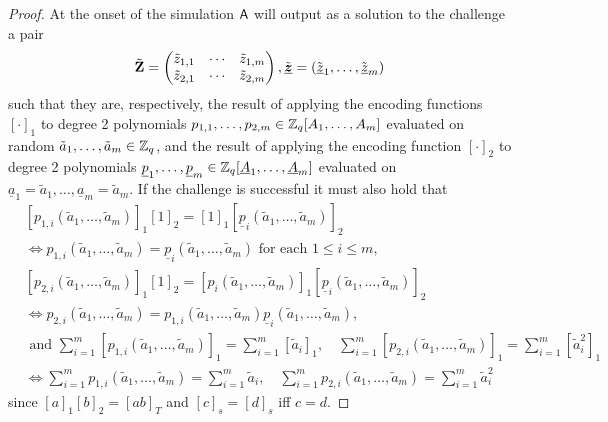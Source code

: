 \begin{proof}
At the onset of the simulation $\mathsf{A}$ will output as a solution to the challenge a pair
$$
\tilde{\mathbf{{Z}}}=\left(\begin{matrix}\tilde{z}_{1,1}&\cdots&\tilde{z}_{1,m}\\\tilde{z}_{2,1}&\cdots&\tilde{z}_{2,m}\end{matrix}\right),\tilde{\underline{{\boldsymbol{z}}}} = (\tilde{\underline{z}}_1,\ldots,\tilde{\underline{z}}_m)
$$
such that they are, respectively, the result of applying the encoding functions $[\cdot]_1$ to degree 2 polynomials $p_{1,1},\ldots,p_{2,m}\in\mathbb{Z}_q[A_{1},\ldots,\allowbreak A_{m}]$ evaluated on random $\tilde{a}_{1},\ldots,\tilde{a}_{m}\in\mathbb{Z}_q$, and the result of applying the encoding function $[\cdot]_2$ to  degree 2 polynomials $\underline{p}_{1},\ldots,\underline{p}_m\in\mathbb{Z}_q[\underline{A}_1,\ldots,\underline{A}_{m}]$ evaluated on $\underline{a}_{1} = \tilde{a}_{1},\ldots,\underline{a}_{m} = \tilde{a}_{m}$.
If the challenge is successful it must also hold that
\begin{align}
&[p_{1,i}(\tilde{a}_{1},\ldots,\tilde{a}_{m})]_1[1]_2 = [1]_1[\underline{p}_i(\tilde{a}_{1},\ldots,\tilde{a}_{m})]_2 \nonumber\\
& \Longleftrightarrow 
p_{1,i}(\tilde{a}_{1},\ldots,\tilde{a}_{m}) = \underline{p}_i(\tilde{a}_{1},\ldots,\tilde{a}_{m}) \text{ for each }1\leq i \leq m,
\label{eq:lin}\\
	&[p_{2,i}(\tilde{a}_{1},\ldots,\tilde{a}_{m})]_1[1]_2 = [p_{i}(\tilde{a}_{1},\ldots,\tilde{a}_{m})]_1[\underline{p}_i(\tilde{a}_{1},\ldots,\tilde{a}_{m})]_2 \nonumber\\
	& \Longleftrightarrow 
	p_{2,i}(\tilde{a}_{1},\ldots,\tilde{a}_{m}) = p_{1,i}(\tilde{a}_{1},\ldots,\tilde{a}_{m})\underline{p}_i(\tilde{a}_{1},\ldots,\tilde{a}_{m}),
	\label{eq:quad}\\
	&\text{ and }
	\sum_{i=1}^m [p_{1,i}(\tilde{a}_{1},\ldots,\tilde{a}_{m})]_1 = \sum_{i=1}^m [\tilde{a}_i]_1,\quad
	\sum_{i=1}^m [p_{2,i}(\tilde{a}_{1},\ldots,\tilde{a}_{m})]_1 = \sum_{i=1}^m [\tilde{a}^2_i]_1 \nonumber\\
	&\Longleftrightarrow
	\sum_{i=1}^m p_{1,i}(\tilde{a}_{1},\ldots,\tilde{a}_{m}) = \sum_{i=1}^m \tilde{a}_i,\quad
	\sum_{i=1}^m p_{2,i}(\tilde{a}_{1},\ldots,\tilde{a}_{m}) = \sum_{i=1}^m \tilde{a}^2_i
	\label{eq:sum}
\end{align}
since $[a]_1[b]_2 = [ab]_T$ and $[c]_s =[d]_s$ iff $c=d$.


\end{proof}
